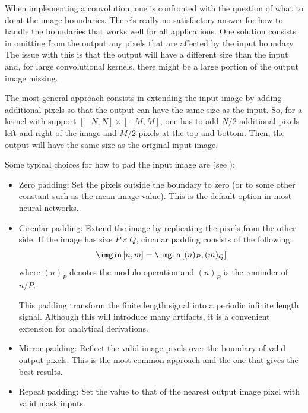 When implementing a convolution, one is confronted with the question of what to do at the image boundaries.
There's really no satisfactory answer for how to handle the
boundaries that works well for all applications. One solution consists in omitting from the output any pixels that are affected by the input boundary. The issue with this is that the output will have a different size than the input and, for large convolutional kernels, there might be a large portion of the output image missing. 

The most general approach consists in extending the input image by adding additional pixels so that the output can have the same size as the input. So, for a kernel with support $\left[ -N, N \right] \times \left[-M, M\right]$, one has to add $N/2$ additional pixels left and right of the image and $M/2$ pixels at the top and bottom. Then, the output will have the same size as the original input image. 

Some typical choices for how to pad the input image are (see \fig{\ref{fig:boundaries}}):
\begin{itemize}
\item Zero padding: Set the pixels outside the boundary to zero (or to some other constant such as the mean image value). This is the default option in most neural networks.
\item Circular padding: Extend the image by replicating the pixels from the other side. If the image has size $P \times Q$, circular padding consists of the following: 
\begin{equation}
\imgin \left[n,m\right] = \imgin \left[(n)_P,(m)_Q\right] 
\end{equation}
where $(n)_P$ denotes the modulo operation and $(n)_P$ is the reminder of $n/P$.

This padding transform the finite length signal into a periodic infinite length signal. Although this will introduce many artifacts, it is a convenient extension for analytical derivations. 
\item Mirror padding: Reflect the valid image pixels over the boundary of valid output pixels. This is the most common approach and the one that gives the best results. 
\item Repeat padding: Set the value to that of the nearest output image pixel with valid mask inputs. 
\end{itemize}

